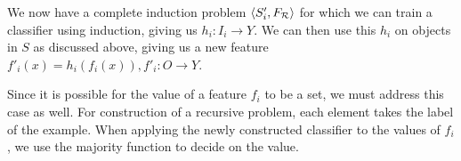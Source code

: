 \documentclass{article}
\theoremstyle{definition}
\begin{document}
We now have a complete induction problem $\langle S'_i,F_{\cal R} \rangle$ for which we can train a classifier using induction, giving us $h_i:I_i\rightarrow Y$. We can then use this $h_i$ on objects in $S$ as discussed above, giving us a new feature $f'_{i}(x)=h_{i}(f_{i}(x)), f'_{i}:O\rightarrow Y$. 


Since it is possible for the value of a feature $f_i$ to be a set, we must address this case as well. For construction of a recursive problem, each element takes the label of the example. When applying the newly constructed classifier to the values of $f_i$, we use the majority function to decide on the value.%



\end{document}
